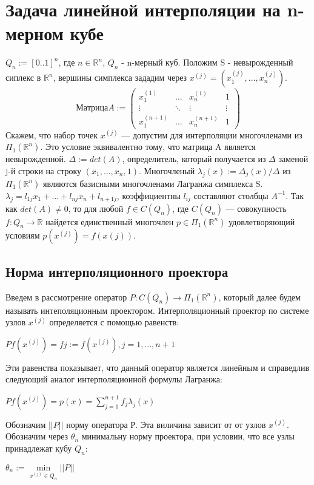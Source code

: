 \documentclass[12pt]{article} %
\begin{document}
	


\newpage
\section{Задача линейной интерполяции на n-мерном кубе}\label{s1}
$Q_ n:= [0..1]^n$, где $n \in \mathbb{R}^n$, $Q_ n$ - n-мерный куб. Положим S - невырожденный сиплекс в $\mathbb{R}^n$, вершины симплекса зададим через $x^{(j)} = (x_1^{(j)},...,x_n^{(j)})$. 
 $$Матрица A := {\begin{pmatrix}
		x_1^{(1)}& \dots & x_n^{(1)}& 1\\
		\vdots & \ddots & \vdots & \vdots \\
		x_1^{(n+1)}& \dots & x_n^{(n+1)}&  1
\end{pmatrix}}$$
Скажем, что набор точек $x^{(j)}$ --- допустим для интерполяции многочленами из $\Pi_1(\mathbb{R}^n)$. Это условие эквивалентно тому, что
матрица A является невырожденной.  
\newline
$\Delta := det(A)$, определитель, который получается  из  $\Delta$ заменой j-й строки на строку $(x_1, \dots, x_n, 1)$. Многочленый $\lambda_j(x) := \Delta_j(x)/\Delta$ из $\Pi_1(\mathbb{R}^n)$ являются базисными многочленами Лагранжа симплекса S. $\lambda_j = l_{1j}x_1 + \dots + l_{nj}x_n + l_{n+1j}$, коэффициентны $l_{ij}$ составляют столбцы $A^{-1}$.
\newline
Так как $det(A) \neq 0 $, то для любой  $f \in C(Q_n)$, где $C(Q_n)$ --- совокупность $f : Q_n \rightarrow \mathbb{R}$ найдется единственный многочлен $p \in \Pi_1(\mathbb{R}^n	)$ удовлетворяющий условиям \newline $p(x^{(j)}) = f(x{(j)})$.
\subsection{Норма интерполяционного проектора}
Введем в рассмотрение оператор $P : C(Q_n)  \rightarrow \Pi_1(\mathbb{R}^n)$, который далее будем называть интеполяционным проектором. Интерполяционный проектор по системе узлов $x^{(j)}$ определяется с помощью равенств: \newline
\begin{center}$Pf(x^{(j)}) = fj := f(x^{(j)}), j = 1,\dots, n+1$ \end{center}

Эти равенства показывает, что данный оператор является линейным и справедлив следующий аналог интерполяционной формулы Лагранжа: \newline
\begin{center}$Pf(x^{(j)}) = p(x) = \sum\limits_{j=1}^{n+1} f_j\lambda_j(x) $\end{center}
Обозначим $||P||$ норму оператора Р. Эта виличина зависит от от узлов $x^{(j)}$. Обозначим через $\theta_n$ минимальну норму проектора, при условии, что все узлы принадлежат кубу $Q_n$:
\begin{center}$\theta_n := \min\limits_{x^{(j)} \in Q_n}||P||$ \end{center} 
\end{document}
